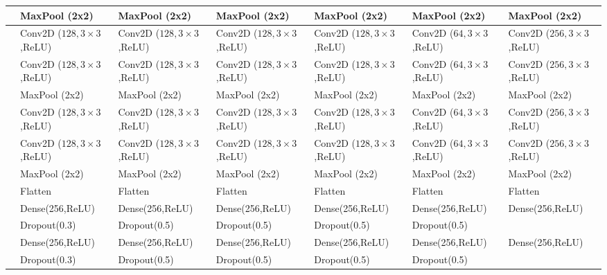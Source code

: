 \begin{table}
\begin{tabular}{l|l|l|l|l|l|l}
         &MaxPool (2x2) & MaxPool (2x2) & MaxPool (2x2) & MaxPool (2x2) & MaxPool (2x2) & MaxPool (2x2) \\
         \midrule
         
         &Conv2D ($128,3\times3$,ReLU) & Conv2D ($128,3\times3$,ReLU) & Conv2D ($128,3\times3$,ReLU) & Conv2D ($128,3\times3$,ReLU) & Conv2D ($64,3\times3$,ReLU) & Conv2D ($256,3\times3$,ReLU) \\
         
         &Conv2D ($128,3\times3$,ReLU) & Conv2D ($128,3\times3$,ReLU) & Conv2D ($128,3\times3$,ReLU) & Conv2D ($128,3\times3$,ReLU) & Conv2D ($64,3\times3$,ReLU) & Conv2D ($256,3\times3$,ReLU) \\
         
         &MaxPool (2x2) & MaxPool (2x2) & MaxPool (2x2) & MaxPool (2x2) & MaxPool (2x2) & MaxPool (2x2) \\
         \midrule         
         
         &Conv2D ($128,3\times3$,ReLU) & Conv2D ($128,3\times3$,ReLU) & Conv2D ($128,3\times3$,ReLU) & Conv2D ($128,3\times3$,ReLU) & Conv2D ($64,3\times3$,ReLU) & Conv2D ($256,3\times3$,ReLU) \\
         
         &Conv2D ($128,3\times3$,ReLU) & Conv2D ($128,3\times3$,ReLU) & Conv2D ($128,3\times3$,ReLU) & Conv2D ($128,3\times3$,ReLU) & Conv2D ($64,3\times3$,ReLU) & Conv2D ($256,3\times3$,ReLU) \\
         
         &MaxPool (2x2) & MaxPool (2x2) & MaxPool (2x2) & MaxPool (2x2) & MaxPool (2x2) & MaxPool (2x2) \\
         \midrule          
         
         &Flatten & Flatten & Flatten & Flatten & Flatten & Flatten \\
         
         &Dense(256,ReLU) & Dense(256,ReLU) & Dense(256,ReLU) & Dense(256,ReLU) & Dense(256,ReLU) & Dense(256,ReLU) \\
         
          & Dropout(0.3) & Dropout(0.5) & Dropout(0.5) & Dropout(0.5) & Dropout(0.5) \\
         
         &Dense(256,ReLU) & Dense(256,ReLU) & Dense(256,ReLU) & Dense(256,ReLU) & Dense(256,ReLU) & Dense(256,ReLU) \\
         
          & Dropout(0.3) & Dropout(0.5) & Dropout(0.5) & Dropout(0.5) & Dropout(0.5) \\
         

\end{tabular}
\end{table}
